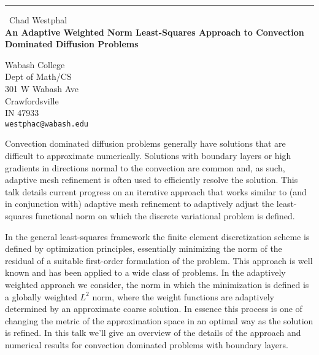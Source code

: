 \documentclass{report}
\begin{document}
\begin{center}
\rule{6in}{1pt} \
{\large Chad Westphal \\
{\bf An Adaptive Weighted Norm Least-Squares Approach to Convection Dominated Diffusion Problems }}

Wabash College \\ Dept of Math/CS \\ 301 W Wabash Ave \\ Crawfordsville \\ IN 47933
\\
{\tt westphac@wabash.edu}\end{center}

Convection dominated diffusion problems generally have solutions that are
difficult to approximate numerically. Solutions with boundary layers or
high gradients in directions normal to the convection are common and, as
such, adaptive mesh refinement is often used to efficiently resolve the
solution. This talk details current progress on an iterative approach
that works similar to (and in conjunction with) adaptive mesh refinement
to adaptively adjust the least-squares functional norm on which the
discrete variational problem is defined.

In the general least-squares framework the finite element discretization
scheme is defined by optimization principles, essentially minimizing the
norm of the residual of a suitable first-order formulation of the
problem. This approach is well known and has been applied to a wide class
of problems. In the adaptively weighted approach we consider, the norm in
which the minimization is defined is a globally weighted $L^2$ norm,
where the weight functions are adaptively determined by an approximate
coarse solution. In essence this process is one of changing the metric of
the approximation space in an optimal way as the solution is refined. In
this talk we'll give an overview of the details of the approach and
numerical results for convection dominated problems with boundary layers.
\end{document}
